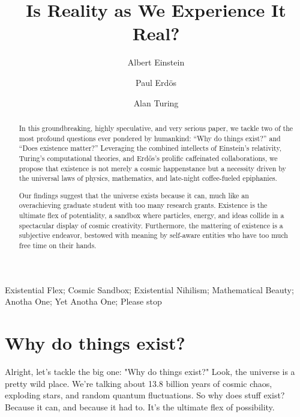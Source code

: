 \documentclass{Axon}
\begin{document}
\begin{frontmatter}
\title{Is Reality as We Experience It Real?}
\author[reality]{Albert Einstein}
\author[complexity]{Paul Erd\"{o}s}
\author[bitwise]{Alan Turing}
\address[reality]{Department of Theoretical Reality, Institute for the Institutionalized}
\address[complexity]{Department of Infinite Complexity, University of Stimulating Ideas}
\address[bitwise]{The Rotary Investigations Lab, Institute of Artificial Reasoning}
\begin{abstract}
In this groundbreaking, highly speculative, and very serious paper, we tackle two of the most profound questions ever pondered by humankind: “Why do things exist?” and “Does existence matter?” Leveraging the combined intellects of Einstein’s relativity, Turing’s computational theories, and Erdős’s prolific caffeinated collaborations, we propose that existence is not merely a cosmic happenstance but a necessity driven by the universal laws of physics, mathematics, and late-night coffee-fueled epiphanies.

Our findings suggest that the universe exists because it can, much like an overachieving graduate student with too many research grants. Existence is the ultimate flex of potentiality, a sandbox where particles, energy, and ideas collide in a spectacular display of cosmic creativity. Furthermore, the mattering of existence is a subjective endeavor, bestowed with meaning by self-aware entities who have too much free time on their hands.
\end{abstract}
\begin{keyword}
Existential Flex; Cosmic Sandbox; Existential Nihilism; Mathematical Beauty; Anotha One; Yet Anotha One; Please stop
\end{keyword}
\end{frontmatter}
\section{Why do things exist?}
Alright, let's tackle the big one: "Why do things exist?" Look, the universe is a pretty wild place. We're talking about 13.8 billion years of cosmic chaos, exploding stars, and random quantum fluctuations. So why does stuff exist? Because it can, and because it had to. It's the ultimate flex of possibility.
\end{document}

